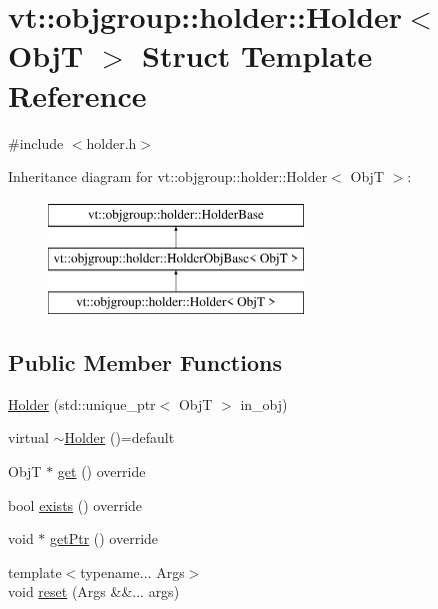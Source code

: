 \hypertarget{structvt_1_1objgroup_1_1holder_1_1_holder}{}\section{vt\+:\+:objgroup\+:\+:holder\+:\+:Holder$<$ ObjT $>$ Struct Template Reference}
\label{structvt_1_1objgroup_1_1holder_1_1_holder}


{\ttfamily \#include $<$holder.\+h$>$}

Inheritance diagram for vt\+:\+:objgroup\+:\+:holder\+:\+:Holder$<$ ObjT $>$\+:\begin{figure}[H]
\begin{center}
\leavevmode
\includegraphics[height=3.000000cm]{structvt_1_1objgroup_1_1holder_1_1_holder}
\end{center}
\end{figure}
\subsection*{Public Member Functions}
\begin{DoxyCompactItemize}
\item 
\hyperlink{structvt_1_1objgroup_1_1holder_1_1_holder_a7e21e5a25aaef942ad43d07e14e726eb}{Holder} (std\+::unique\+\_\+ptr$<$ ObjT $>$ in\+\_\+obj)
\item 
virtual \hyperlink{structvt_1_1objgroup_1_1holder_1_1_holder_acc7eb26ff3152043f63164898469fc78}{$\sim$\+Holder} ()=default
\item 
ObjT $\ast$ \hyperlink{structvt_1_1objgroup_1_1holder_1_1_holder_afa4ab0b8ce4108ad94f602772697c25d}{get} () override
\item 
bool \hyperlink{structvt_1_1objgroup_1_1holder_1_1_holder_a0c18e5f4287e37e6a89a72df90e68273}{exists} () override
\item 
void $\ast$ \hyperlink{structvt_1_1objgroup_1_1holder_1_1_holder_a856859dca0c0ee3fb6ebace444a36200}{get\+Ptr} () override
\item 
{\footnotesize template$<$typename... Args$>$ }\\void \hyperlink{structvt_1_1objgroup_1_1holder_1_1_holder_a4ce99c48b611a65189a6891c780b6500}{reset} (Args \&\&... args)
\end{DoxyCompactItemize}
